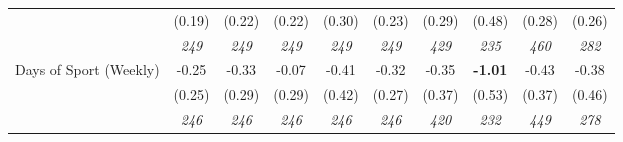 \begin{tabular}{l c c c c c c c c c}
& (0.19) & (0.22) & (0.22) & (0.30) & (0.23) & (0.29) & (0.48) & (0.28) & (0.26) \\
& \textit{ 249 } & \textit{ 249 } & \textit{ 249 } & \textit{ 249 } & \textit{ 249 } & \textit{ 429 } & \textit{ 235 } & \textit{ 460 } & \textit{ 282 } \\
Days of Sport (Weekly) & -0.25 & -0.33 & -0.07 & -0.41 & -0.32 & -0.35 & \textbf{-1.01} & -0.43 & -0.38 \\
& (0.25) & (0.29) & (0.29) & (0.42) & (0.27) & (0.37) & (0.53) & (0.37) & (0.46) \\
& \textit{ 246 } & \textit{ 246 } & \textit{ 246 } & \textit{ 246 } & \textit{ 246 } & \textit{ 420 } & \textit{ 232 } & \textit{ 449 } & \textit{ 278 } \\
\bottomrule
\end{tabular}
